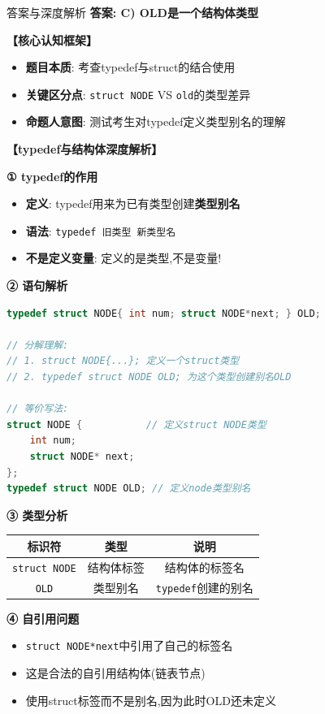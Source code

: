 \documentclass[a4paper,12pt]{article}
\begin{document}
\begin{bluebox}{答案与深度解析}
	\textbf{答案: C) OLD是一个结构体类型}

	\textbf{【核心认知框架】}
	\begin{itemize}[leftmargin=*, nosep]
		\item \textbf{题目本质}: 考查typedef与struct的结合使用
		\item \textbf{关键区分点}: \texttt{struct NODE} VS \texttt{old}的类型差异
		\item \textbf{命题人意图}: 测试考生对typedef定义类型别名的理解
	\end{itemize}

	\textbf{【typedef与结构体深度解析】}

	\textbf{① typedef的作用}
	\begin{itemize}[leftmargin=*, nosep]
		\item \textbf{定义}: typedef用来为已有类型创建\textbf{类型别名}
		\item \textbf{语法}: \texttt{typedef 旧类型 新类型名}
		\item \textbf{不是定义变量}: 定义的是类型,不是变量!
	\end{itemize}

	\textbf{② 语句解析}
	\begin{lstlisting}[language=C]
typedef struct NODE{ int num; struct NODE*next; } OLD;

// 分解理解:
// 1. struct NODE{...}; 定义一个struct类型
// 2. typedef struct NODE OLD; 为这个类型创建别名OLD

// 等价写法:
struct NODE {           // 定义struct NODE类型
    int num;
    struct NODE* next;
};
typedef struct NODE OLD; // 定义node类型别名
    \end{lstlisting}

	\textbf{③ 类型分析}
	\begin{tabular}{|c|c|c|}
		\hline
		\textbf{标识符}         & \textbf{类型} & \textbf{说明}           \\
		\hline
		\texttt{struct NODE} & 结构体标签       & 结构体的标签名               \\
		\hline
		\texttt{OLD}         & 类型别名        & \texttt{typedef}创建的别名 \\
		\hline
	\end{tabular}

	\textbf{④ 自引用问题}
	\begin{itemize}[leftmargin=*, nosep]
		\item \texttt{struct NODE*next}中引用了自己的标签名
		\item 这是合法的自引用结构体(链表节点)
		\item 使用struct标签而不是别名,因为此时OLD还未定义
	\end{itemize}


\end{bluebox}
\end{document}
